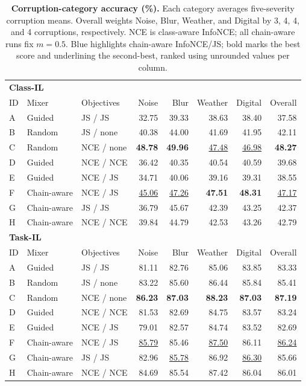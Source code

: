 \begin{table}[t]
\centering\small
\begin{tabular}{lllrrrrr}
\toprule
\multicolumn{8}{l}{\textbf{Class-IL}} \\
ID & Mixer & Objectives & Noise & Blur & Weather & Digital & Overall \\
\midrule
A & Guided & JS / JS & 32.75 & 39.33 & 38.63 & 38.40 & 37.58 \\
B & Random & JS / none & 40.38 & 44.00 & 41.69 & 41.95 & 42.11 \\
C & Random & NCE / none & \textbf{48.78} & \textbf{49.96} & \underline{47.48} & \underline{46.98} & \textbf{48.27} \\
D & Guided & NCE / NCE & 36.42 & 40.35 & 40.54 & 40.59 & 39.68 \\
E & Guided & NCE / JS & 34.71 & 40.06 & 39.16 & 39.31 & 38.55 \\
\rowcolor{ourrow} F & Chain-aware & NCE / JS & \underline{45.06} & \underline{47.26} & \textbf{47.51} & \textbf{48.31} & \underline{47.17} \\
G & Chain-aware & JS / JS & 36.79 & 45.67 & 42.39 & 43.25 & 42.37 \\
H & Chain-aware & NCE / NCE & 39.84 & 44.79 & 42.53 & 43.26 & 42.79 \\
\midrule
\multicolumn{8}{l}{\textbf{Task-IL}} \\
ID & Mixer & Objectives & Noise & Blur & Weather & Digital & Overall \\
\midrule
A & Guided & JS / JS & 81.11 & 82.76 & 85.06 & 83.85 & 83.33 \\
B & Random & JS / none & 83.22 & 85.60 & 86.44 & 85.84 & 85.41 \\
C & Random & NCE / none & \textbf{86.23} & \textbf{87.03} & \textbf{88.23} & \textbf{87.03} & \textbf{87.19} \\
D & Guided & NCE / NCE & 81.53 & 82.69 & 84.75 & 83.57 & 83.24 \\
E & Guided & NCE / JS & 79.01 & 82.57 & 84.74 & 83.52 & 82.69 \\
\rowcolor{ourrow} F & Chain-aware & NCE / JS & \underline{85.79} & 85.46 & \underline{87.50} & 86.11 & \underline{86.24} \\
G & Chain-aware & JS / JS & 82.96 & \underline{85.78} & 86.92 & \underline{86.30} & 85.66 \\
H & Chain-aware & NCE / NCE & 84.69 & 85.54 & 87.42 & 86.04 & 86.01 \\
\bottomrule
\end{tabular}
\caption{\textbf{Corruption-category accuracy (\%).} Each category averages
five-severity corruption means. Overall weights Noise, Blur, Weather, and
Digital by 3, 4, 4, and 4 corruptions, respectively. NCE is class-aware InfoNCE;
all chain-aware runs fix $m=0.5$. Blue highlights chain-aware InfoNCE/JS;
bold marks the best score and underlining the second-best, ranked using unrounded values per column.}
\label{tab:categories}
\end{table}
